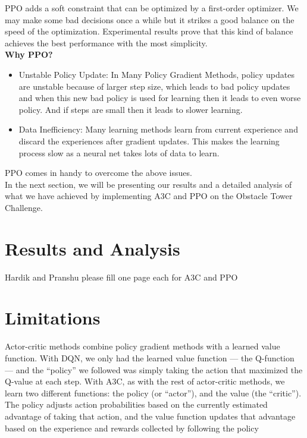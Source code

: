 \documentclass[conference]{IEEEtran}
\begin{document}
PPO adds a soft constraint that can be optimized by a first-order optimizer. We may make some bad decisions once a while but it strikes a good balance on the speed of the optimization. Experimental results prove that this kind of balance achieves the best performance with the most simplicity.\\

\textbf{Why PPO?}\\

\begin{itemize}
\item Unstable Policy Update: In Many Policy Gradient Methods, policy updates are unstable because of larger step size, which leads to bad policy updates and when this new bad policy is used for learning then it leads to even worse policy. And if steps are small then it leads to slower learning. \\
\item Data Inefficiency: Many learning methods learn from current experience and discard the experiences after gradient updates. This makes the learning process slow as a neural net takes lots of data to learn.\\
\end{itemize}

PPO comes in handy to overcome the above issues.\\

In the next section, we will be presenting our results and a detailed analysis of what we have achieved by implementing A3C and PPO on the Obstacle Tower Challenge.

\section{Results and Analysis}

Hardik and Pranshu please fill one page each for A3C and PPO

\section{Limitations}

Actor-critic methods combine policy gradient methods with a learned value function. With DQN, we only had the learned value function — the Q-function — and the “policy” we followed was simply taking the action that maximized the Q-value at each step. With A3C, as with the rest of actor-critic methods, we learn two different functions: the policy (or “actor”), and the value (the “critic”). The policy adjusts action probabilities based on the currently estimated advantage of taking that action, and the value function updates that advantage based on the experience and rewards collected by following the policy
\end{document}
